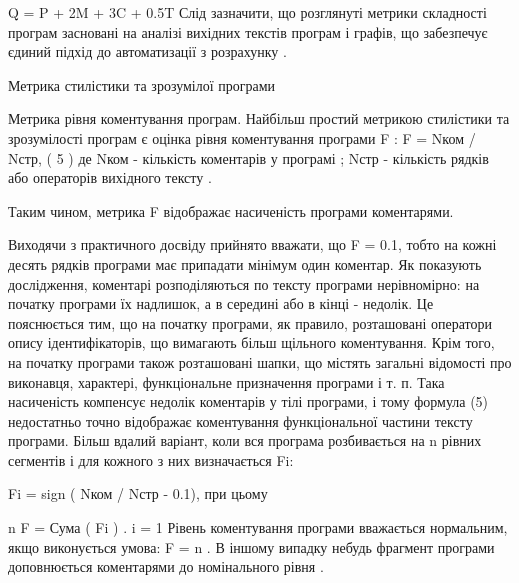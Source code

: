 Q = P + 2M + 3C + 0.5T
Слід зазначити, що розглянуті метрики складності програм засновані на аналізі вихідних текстів програм і графів, що забезпечує єдиний підхід до автоматизації з розрахунку .


Метрика стилістики та зрозумілої програми

Метрика рівня коментування програм.
Найбільш простий метрикою стилістики та зрозумілості програм є оцінка рівня коментування програми F :
F = Nком / Nстр, ( 5 )
де Nком - кількість коментарів у програмі ; Nстр - кількість рядків або операторів вихідного тексту .

Таким чином, метрика F відображає насиченість програми коментарями.

Виходячи з практичного досвіду прийнято вважати, що F = 0.1, тобто на кожні десять рядків програми має припадати мінімум один коментар. Як показують дослідження, коментарі розподіляються по тексту програми нерівномірно: на початку програми їх надлишок, а в середині або в кінці - недолік. Це пояснюється тим, що на початку програми, як правило, розташовані оператори опису ідентифікаторів, що вимагають більш щільного коментування. Крім того, на початку програми також розташовані шапки, що містять загальні відомості про виконавця, характері, функціональне призначення програми і т. п. Така насиченість компенсує недолік коментарів у тілі програми, і тому формула (5) недостатньо точно відображає коментування функціональної частини тексту програми.
Більш вдалий варіант, коли вся програма розбивається на n рівних сегментів і для кожного з них визначається Fi:

Fi = sign ( Nком / Nстр - 0.1),
при цьому

n
F = Сума ( Fi ) .
i = 1
Рівень коментування програми вважається нормальним, якщо виконується умова: F = n . В іншому випадку небудь фрагмент програми доповнюється коментарями до номінального рівня .

